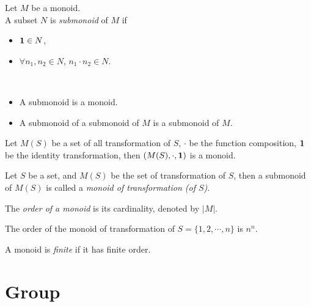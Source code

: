 \begin{definition}[Submonoid] Let $M$ be a monoid.
    \\ A subset $N$ is \textit{submonoid} of $M$ if
    \begin{itemize}
        \item $\mathbf{1} \in N$,
        \item $\forall n_1, n_2 \in N$, $n_1 \cdot n_2 \in N$.
    \end{itemize}
\end{definition}

\begin{remark} ~
\begin{itemize}
    \item A submonoid is a monoid.
    \item A submonoid of a submonoid of $M$ is a submonoid of $M$.
\end{itemize}
\end{remark}



\begin{eg}
    Let $M(S)$ be a set of all transformation of $S$, $\cdot $ be the function composition, $\mathbf{1}$ be the identity transformation, then $(M(S),\cdot , \mathbf{1})$ is a monoid.
\end{eg}

\begin{definition} Let $S$ be a set, and $M(S)$ be the set of transformation of $S$, then a submonoid of $M(S)$ is called a \textit{monoid of transformation (of $S$)}.
\end{definition}

\begin{definition}
    The \textit{order of a monoid}  is its cardinality, denoted by $|M|$.
\end{definition}

\begin{remark}
    The order of the monoid of transformation of $S = \{ 1,2,\cdots ,n \}$ is $n^{n}$.
\end{remark}
    
\begin{definition}[Finite]
    A monoid is \textit{finite}  if it has finite order.
\end{definition}

\newpage

\section{Group} \label{sec:}

